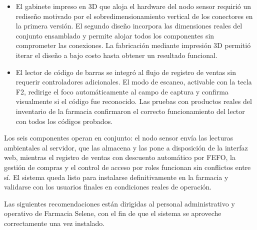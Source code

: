 \begin{itemize}
    \item El gabinete impreso en 3D que aloja el hardware del nodo sensor requirió un rediseño motivado por el sobredimensionamiento vertical de los conectores en la primera versión. El segundo diseño incorpora las dimensiones reales del conjunto ensamblado y permite alojar todos los componentes sin comprometer las conexiones. La fabricación mediante impresión 3D permitió iterar el diseño a bajo costo hasta obtener un resultado funcional.

    \item El lector de código de barras se integró al flujo de registro de ventas sin requerir controladores adicionales. El modo de escaneo, activable con la tecla F2, redirige el foco automáticamente al campo de captura y confirma visualmente si el código fue reconocido. Las pruebas con productos reales del inventario de la farmacia confirmaron el correcto funcionamiento del lector con todos los códigos probados.

\end{itemize}

Los seis componentes operan en conjunto: el nodo sensor envía las lecturas ambientales al servidor, que las almacena y las pone a disposición de la interfaz web, mientras el registro de ventas con descuento automático por FEFO, la gestión de compras y el control de acceso por roles funcionan sin conflictos entre sí. El sistema queda listo para instalarse definitivamente en la farmacia y validarse con los usuarios finales en condiciones reales de operación.



Las siguientes recomendaciones están dirigidas al personal administrativo y operativo de Farmacia Selene, con el fin de que el sistema se aproveche correctamente una vez instalado.

